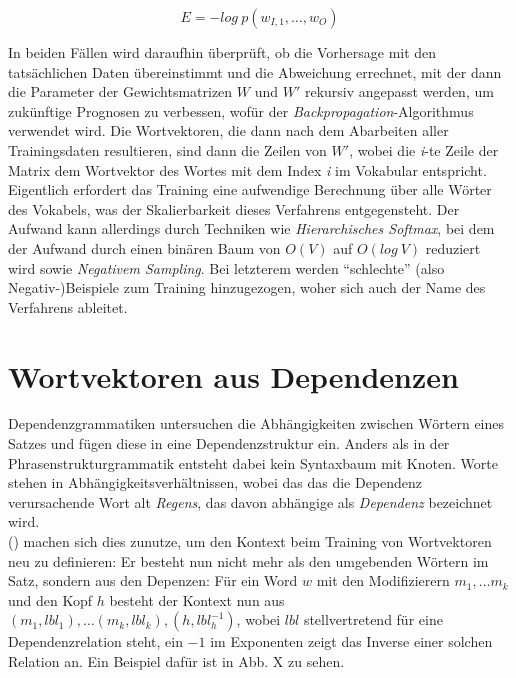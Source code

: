 \begin{equation}
  E = - log\ p(w_{I,1}, \ldots, w_O)
\end{equation}

In beiden Fällen wird daraufhin überprüft, ob die Vorhersage mit den tatsächlichen Daten übereinstimmt und die Abweichung
errechnet, mit der dann die Parameter der Gewichtsmatrizen $W$ und $W'$ rekursiv angepasst werden, um zukünftige Prognosen
zu verbessen, wofür der \emph{Backpropagation}-Algorithmus verwendet wird. Die Wortvektoren, die dann nach dem Abarbeiten aller Trainingsdaten resultieren, sind dann die Zeilen von
$W'$, wobei die \emph{i}-te Zeile der Matrix dem Wortvektor des Wortes mit dem Index \emph{i} im Vokabular entspricht.\\
Eigentlich erfordert das Training eine aufwendige Berechnung über alle Wörter des Vokabels, was der Skalierbarkeit dieses
Verfahrens entgegensteht. Der Aufwand kann allerdings durch Techniken wie \emph{Hierarchisches Softmax}, bei dem
der Aufwand durch einen binären Baum von $O(V)$ auf $O(log\ V)$ reduziert wird sowie
\emph{Negativem Sampling}. Bei letzterem werden ``schlechte'' (also Negativ-)Beispiele zum Training hinzugezogen,
woher sich auch der Name des Verfahrens ableitet.\\

\section{Wortvektoren aus Dependenzen}

Dependenzgrammatiken untersuchen die Abhängigkeiten zwischen Wörtern eines Satzes und fügen diese in eine Dependenzstruktur ein.
Anders als in der Phrasenstrukturgrammatik entsteht dabei kein Syntaxbaum mit Knoten. Worte stehen in Abhängigkeitsverhältnissen,
wobei das das die Dependenz verursachende Wort alt \emph{Regens}, das davon abhängige als \emph{Dependenz} bezeichnet wird.\\
(\citeauthor{levy2014dependency}) machen sich dies zunutze, um den Kontext beim Training von Wortvektoren neu zu definieren:
Er besteht nun nicht mehr als den umgebenden Wörtern im Satz, sondern aus den Depenzen: Für ein Word $w$ mit den Modifizierern
$m_1, \ldots m_k$ und den Kopf $h$ besteht der Kontext nun aus $(m_1, lbl_1), \ldots (m_k, lbl_k), (h, lbl_h^{-1})$, wobei
$lbl$ stellvertretend für eine Dependenzrelation steht, ein $-1$ im Exponenten zeigt das Inverse einer solchen Relation an.
Ein Beispiel dafür ist in Abb. X zu sehen.\\

